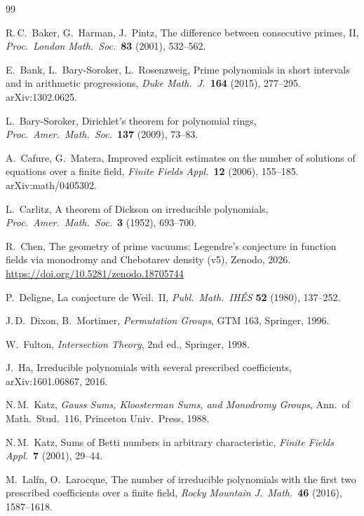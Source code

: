 \documentclass[11pt,a4paper]{article}
\theoremstyle{definition}
\theoremstyle{remark}
\begin{document}
\begin{thebibliography}{99}

R.\,C.~Baker, G.~Harman, J.~Pintz,
The difference between consecutive primes, II,
\textit{Proc.\ London Math.\ Soc.}\ \textbf{83} (2001), 532--562.

E.~Bank, L.~Bary-Soroker, L.~Rosenzweig,
Prime polynomials in short intervals and in arithmetic progressions,
\textit{Duke Math.\ J.}\ \textbf{164} (2015), 277--295. arXiv:1302.0625.

L.~Bary-Soroker,
Dirichlet's theorem for polynomial rings,
\textit{Proc.\ Amer.\ Math.\ Soc.}\ \textbf{137} (2009), 73--83.

A.~Cafure, G.~Matera,
Improved explicit estimates on the number of solutions of equations over a finite field,
\textit{Finite Fields Appl.}\ \textbf{12} (2006), 155--185. arXiv:math/0405302.

L.~Carlitz,
A theorem of Dickson on irreducible polynomials,
\textit{Proc.\ Amer.\ Math.\ Soc.}\ \textbf{3} (1952), 693--700.

R.~Chen,
The geometry of prime vacuums: Legendre's conjecture in function fields via monodromy and
Chebotarev density (v5), Zenodo, 2026. \url{https://doi.org/10.5281/zenodo.18705744}

P.~Deligne,
La conjecture de Weil.~II,
\textit{Publ.\ Math.\ IH\'ES} \textbf{52} (1980), 137--252.

J.\,D.~Dixon, B.~Mortimer,
\textit{Permutation Groups}, GTM 163, Springer, 1996.

W.~Fulton,
\textit{Intersection Theory}, 2nd ed., Springer, 1998.

J.~Ha,
Irreducible polynomials with several prescribed coefficients,
arXiv:1601.06867, 2016.

N.\,M.~Katz,
\textit{Gauss Sums, Kloosterman Sums, and Monodromy Groups},
Ann.\ of Math.\ Stud.\ 116, Princeton Univ.\ Press, 1988.

N.\,M.~Katz,
Sums of Betti numbers in arbitrary characteristic,
\textit{Finite Fields Appl.}\ \textbf{7} (2001), 29--44.

M.~Lal\'in, O.~Larocque,
The number of irreducible polynomials with the first two prescribed coefficients over a finite field,
\textit{Rocky Mountain J.\ Math.}\ \textbf{46} (2016), 1587--1618.


\end{thebibliography}
\end{document}
